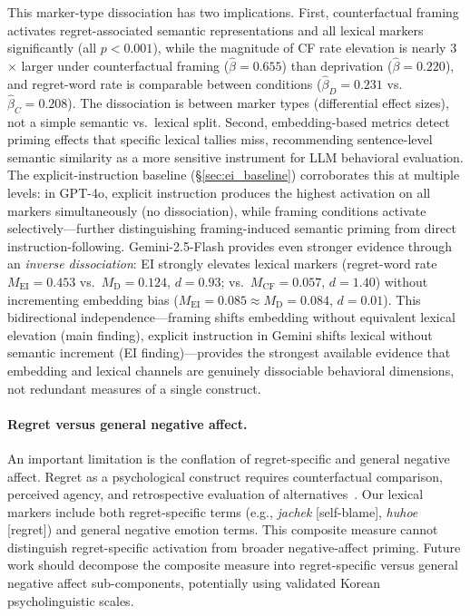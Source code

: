 \documentclass[conference,10pt]{IEEEtran}
\begin{document}
This marker-type dissociation has two implications. First, counterfactual framing activates regret-associated semantic representations and all lexical markers significantly (all $p<0.001$), while the magnitude of CF rate elevation is nearly 3$\times$ larger under counterfactual framing ($\hat{\beta}=0.655$) than deprivation ($\hat{\beta}=0.220$), and regret-word rate is comparable between conditions ($\hat{\beta}_D=0.231$ vs.\ $\hat{\beta}_C=0.208$). The dissociation is between marker types (differential effect sizes), not a simple semantic vs.\ lexical split. Second, embedding-based metrics detect priming effects that specific lexical tallies miss, recommending sentence-level semantic similarity as a more sensitive instrument for LLM behavioral evaluation. The explicit-instruction baseline (\S\ref{sec:ei_baseline}) corroborates this at multiple levels: in GPT-4o, explicit instruction produces the highest activation on all markers simultaneously (no dissociation), while framing conditions activate selectively---further distinguishing framing-induced semantic priming from direct instruction-following. Gemini-2.5-Flash provides even stronger evidence through an \emph{inverse dissociation}: EI strongly elevates lexical markers (regret-word rate $M_\text{EI}=0.453$ vs.\ $M_\text{D}=0.124$, $d=0.93$; vs.\ $M_\text{CF}=0.057$, $d=1.40$) without incrementing embedding bias ($M_\text{EI}=0.085 \approx M_\text{D}=0.084$, $d=0.01$). This bidirectional independence---framing shifts embedding without equivalent lexical elevation (main finding), explicit instruction in Gemini shifts lexical without semantic increment (EI finding)---provides the strongest available evidence that embedding and lexical channels are genuinely dissociable behavioral dimensions, not redundant measures of a single construct.

\paragraph{Regret versus general negative affect.}
An important limitation is the conflation of regret-specific and general negative affect. Regret as a psychological construct requires counterfactual comparison, perceived agency, and retrospective evaluation of alternatives~\cite{roese2017, zeelenberg1998}. Our lexical markers include both regret-specific terms (e.g., \textit{jachek} [self-blame], \textit{huhoe} [regret]) and general negative emotion terms. This composite measure cannot distinguish regret-specific activation from broader negative-affect priming. Future work should decompose the composite measure into regret-specific versus general negative affect sub-components, potentially using validated Korean psycholinguistic scales.
\end{document}
